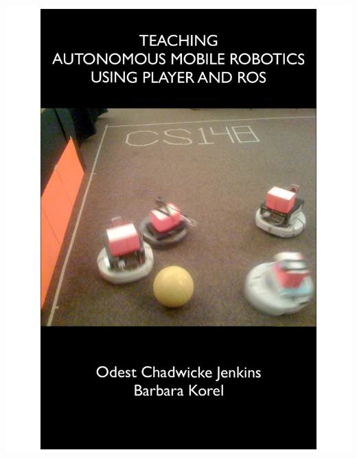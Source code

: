 \documentclass[12pt,openany]{book} %
\begin{document}
\begin{titlepage}

\begin{center}
\includegraphics[scale=0.76]{figures/book_cover_may2010.pdf}
\end{center}

\end{titlepage}


\tableofcontents
\newpage












\end{document}
